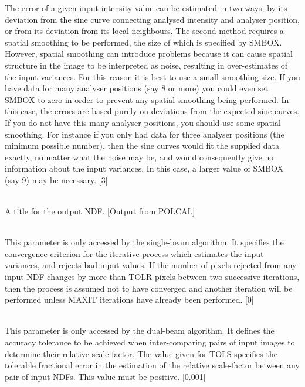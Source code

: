 \documentclass[twoside,11pt]{article}
\renewcommand{\_}{\texttt{\symbol{95}}}
\newcommand{\sstsubsection}[1]{ \item[{#1}] \mbox{} \\}
\newcommand{\sstsubsection}[1]{\item[{#1}]}
\begin{document}
{{{         The error of a given input intensity value can be estimated
         in two ways, by its deviation from the sine curve connecting
         analysed intensity and analyser position, or from its deviation
         from its local neighbours. The second method requires a spatial
         smoothing to be performed, the size of which is specified by
         SMBOX. However, spatial smoothing can introduce problems because
         it can cause spatial structure in the image to be interpreted as
         noise, resulting in over-estimates of the input variances. For
         this reason it is best to use a small smoothing size. If you
         have data for many analyser positions (say 8 or more) you could
         even set SMBOX to zero in order to prevent any spatial smoothing
         being performed. In this case, the errors are based purely on
         deviations from the expected sine curves. If you do not have
         this many analyser positions, you should use some spatial
         smoothing. For instance if you only had data for three analyser
         positions (the minimum possible number), then the sine curves
         would fit the supplied data exactly, no matter what the noise
         may be, and would consequently give no information about the input
         variances. In this case, a larger value of SMBOX (say 9) may be
         necessary. [3]
      }
      \sstsubsection{
         TITLE = LITERAL (Read)
      }{
         A title for the output NDF. [Output from POLCAL]
      }
      \sstsubsection{
         TOLR = \_INTEGER (Read)
      }{
         This parameter is only accessed by the single-beam algorithm. It
         specifies the convergence criterion for the iterative process
         which estimates the input variances, and rejects bad input values.
         If the number of pixels rejected from any input NDF changes by more
         than TOLR pixels between two successive iterations, then the process
         is assumed not to have converged and another iteration will be
         performed unless MAXIT iterations have already been performed. [0]
      }
      \sstsubsection{
         TOLS = \_REAL (Read)
      }{
         This parameter is only accessed by the dual-beam algorithm. It
         defines the accuracy tolerance to be achieved when inter-comparing
         pairs of input images to determine their relative scale-factor. The
         value given for TOLS specifies the tolerable fractional error in the
         estimation of the relative scale-factor between any pair of input
         NDFs. This value must be positive. [0.001]
}}}
\end{document}
